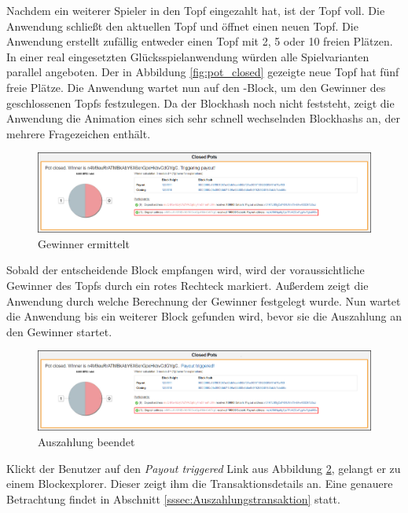 Nachdem ein weiterer Spieler in den Topf eingezahlt hat, ist der Topf voll. Die Anwendung schließt den aktuellen Topf und öffnet einen neuen Topf. Die Anwendung erstellt zufällig entweder einen Topf mit 2, 5 oder 10 freien Plätzen. In einer real eingesetzten Glücksspielanwendung würden alle Spielvarianten parallel angeboten. Der in Abbildung \ref{fig:pot_closed} gezeigte neue Topf hat fünf freie Plätze. Die Anwendung wartet nun auf den -Block, um den Gewinner des geschlossenen Topfs festzulegen. Da der Blockhash noch nicht feststeht, zeigt die Anwendung die Animation eines sich sehr schnell wechselnden Blockhashs an, der mehrere Fragezeichen enthält.

\begin{figure}[H]
\centering
\includegraphics[width=1\linewidth]{Figures/btc_gui/pot_closed_triggering_payout}
\decoRule
\caption{Gewinner ermittelt}
\label{fig:pot_closed_triggering_payout}
\end{figure}
Sobald der entscheidende Block empfangen wird, wird der voraussichtliche Gewinner des Topfs durch ein rotes Rechteck markiert. Außerdem zeigt die Anwendung durch welche Berechnung der Gewinner festgelegt wurde. Nun wartet die Anwendung bis ein weiterer Block gefunden wird, bevor sie die Auszahlung an den Gewinner startet. 

\begin{figure}[H]
\centering
\includegraphics[width=1\linewidth]{Figures/btc_gui/pot_closed_payout_finished}
\decoRule
\caption{Auszahlung beendet}
\label{fig:pot_closed_payout_finished}
\end{figure}

Klickt der Benutzer auf den \emph{Payout triggered} Link aus Abbildung \ref{fig:pot_closed_payout_finished}, gelangt er zu einem Blockexplorer. Dieser zeigt ihm die Transaktionsdetails an. Eine genauere Betrachtung findet in Abschnitt \ref{sssec:Auszahlungstransaktion} statt.